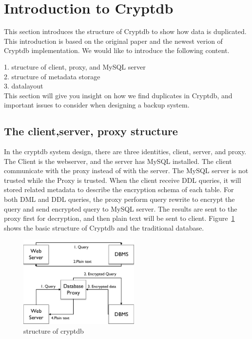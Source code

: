 \section{Introduction to Cryptdb}

This section introduces the structure of Cryptdb to show how data is duplicated. This introduction is based on the original paper and the newest verion of Cryptdb implementation. We would like to introduce the following content.

1. structure of client, proxy, and MySQL server\\

2. structure of metadata storage\\

3. datalayout \\

This section will give you insight on how we find duplicates in Cryptdb, and important issues to consider when designing a backup system.



\subsection{The client,server, proxy structure}

In the cryptdb system design, there are three identities, client, server, and proxy. The Client is the webserver, and the server has MySQL installed. The client communicate with the proxy instead of with the server. The MySQL server is not trusted while the Proxy is trusted. When the client receive DDL queries, it will stored related metadata to describe the encryption schema of each table. For both DML and DDL queries, the proxy perform query rewrite to encrypt the query and send encrypted query to MySQL server. The results are sent to the proxy first for decryption, and then plain text will be sent to client. Figure~\ref{fig:stack1} shows the basic structure of Cryptdb and the traditional database. 


\begin{figure}[tb]
\centering
\includegraphics[width=6cm]{images/Cryptdb-structure.pdf}
\caption{structure of cryptdb}
\label{fig:stack1}
\end{figure}



